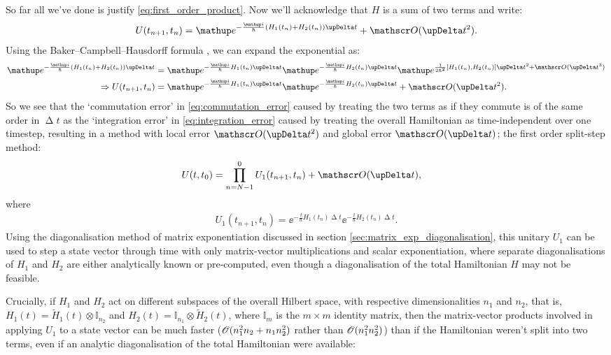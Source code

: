 So far all we've done is justify \eqref{eq:first_order_product}. Now we'll acknowledge that $H$ is a sum of two terms and write:
\begin{align}
U(t_{n+1}, t_n) = \ee^{-\frac \ii \hbar \left(H_1(t_n) + H_2(t_n)\right)\upDelta t} + \Ord{\upDelta t^2}.
\end{align}
Using the Baker--Campbell--Hausdorff formula \cite[p.~158]{tannor_introduction_2007}, we can expand the exponential as:
\begin{align}
\ee^{-\frac \ii \hbar \left(H_1(t_n) + H_2(t_n)\right)\upDelta t}
&= \ee^{-\frac \ii \hbar H_1(t_n)\upDelta t}
  \ee^{-\frac \ii \hbar H_2(t_n)\upDelta t}
  \ee^{\frac 1 {2\hbar^2} \left[H_1(t_n), H_2(t_n)\right]\upDelta t^2 + \Ord{\upDelta t^3}}\\
\Rightarrow U(t_{n+1}, t_n)
&= \ee^{-\frac \ii \hbar H_1(t_n)\upDelta t}
  \ee^{-\frac \ii \hbar H_2(t_n)\upDelta t} + \Ord{\upDelta t^2}\label{eq:commutation_error}.
\end{align}
So we see that the `commutation error' in \eqref{eq:commutation_error} caused by treating the two terms as if they commute is of the same order in $\upDelta t$ as the `integration error' in \eqref{eq:integration_error} caused by treating the overall Hamiltonian as time-independent over one timestep, resulting in a method with local error $\Ord{\upDelta t^2}$ and global error $\Ord{\upDelta t}$; the first order split-step method:
\begin{align}
U(t, t_0) &= \prod_{n=N-1}^0 U_1(t_{n+1}, t_n) + \Ord{\upDelta t},
\end{align}
where
\begin{align}\label{eq:U_1}
U_1(t_{n+1}, t_n) = \ee^{-\frac \ii \hbar H_1(t_n)\upDelta t}
                    \ee^{-\frac \ii \hbar H_2(t_n)\upDelta t}.
\end{align}
Using the diagonalisation method of matrix exponentiation discussed in section \ref{sec:matrix_exp_diagonalisation}, this unitary $U_1$ can be used to step a state vector through time with only matrix-vector multiplications and scalar exponentiation, where separate diagonalisations of $H_1$ and $H_2$ are either analytically known or pre-computed, even though a diagonalisation of the total Hamiltonian $H$ may not be feasible.

Crucially, if $H_1$ and $H_2$ act on different subspaces of the overall Hilbert space, with respective dimensionalities $n_1$ and $n_2$, that is, $H_1(t) = \tilde H_1(t)\otimes\mathbb{I}_{n_2} $ and $H_2(t) = \mathbb{I}_{n_1}\otimes\tilde H_2(t)$, where $\mathbb{I}_m$ is the $m\times m$ identity matrix, then the matrix-vector products involved in applying $U_1$ to a state vector can be much faster ($\mathscr{O}(n_1^2 n_2 + n_1 n_2^2)$ rather than $\mathscr{O}(n_1^2 n_2^2)$) than if the Hamiltonian weren't split into two terms, even if an analytic diagonalisation of the total Hamiltonian were available:


